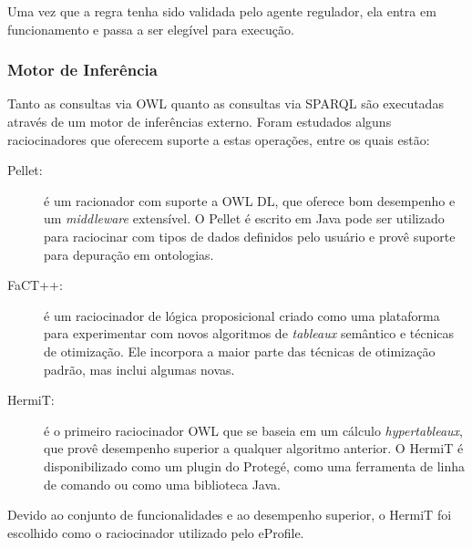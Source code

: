 Uma vez que a regra tenha sido validada pelo agente regulador, ela entra em funcionamento e passa a ser elegível para execução.


\subsubsection{Motor de Inferência}

Tanto as consultas via OWL quanto as consultas via SPARQL são executadas através de um motor de inferências externo. Foram estudados alguns raciocinadores que oferecem suporte a estas operações, entre os quais estão:

\begin{description}

\item[Pellet:] é um racionador com suporte a OWL DL, que oferece bom desempenho e um \emph{middleware} extensível. O Pellet é escrito em Java pode ser utilizado para raciocinar com tipos de dados definidos pelo usuário e provê suporte para depuração em ontologias\cite{sirin05}.

\item[FaCT++:] é um raciocinador de lógica proposicional criado como uma plataforma para experimentar com novos algoritmos de \emph{tableaux} semântico e técnicas de otimização. Ele incorpora a maior parte das técnicas de otimização padrão, mas inclui algumas novas\cite{tsarkov06}.

\item[HermiT:] é o primeiro raciocinador OWL que se baseia em um cálculo \emph{hypertableaux}, que provê desempenho superior a qualquer algoritmo anterior\cite{motik09}. O HermiT é disponibilizado como um plugin do Protegé, como uma ferramenta de linha de comando ou como uma biblioteca Java.

\end{description}

Devido ao conjunto de funcionalidades e ao desempenho superior, o HermiT foi escolhido como o raciocinador utilizado pelo eProfile.
